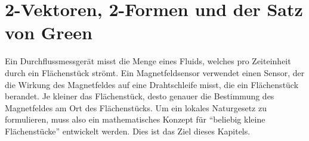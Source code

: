 %
%
%
\chapter{2-Vektoren, 2-Formen und der Satz von Green
\label{chapter:green}}

\noindent
Ein Durchflussmessgerät misst die Menge eines Fluids, welches pro
Zeiteinheit durch ein Flächenstück strömt.
Ein Magnetfeldsensor verwendet einen Sensor, der die Wirkung des Magnetfeldes
auf eine Drahtschleife misst, die ein Flächenstück berandet.
Je kleiner das Flächenstück, desto genauer die Bestimmung des Magnetfeldes
am Ort des Flächenstücks.
Um ein lokales Naturgesetz zu formulieren, muss also ein mathematisches
Konzept für ``beliebig kleine Flächenstücke'' entwickelt werden.
Dies ist das Ziel dieses Kapitels.







\uebungsabschnitt

\begin{uebungsaufgaben}
\end{uebungsaufgaben}
\enduebungsabschnitt

